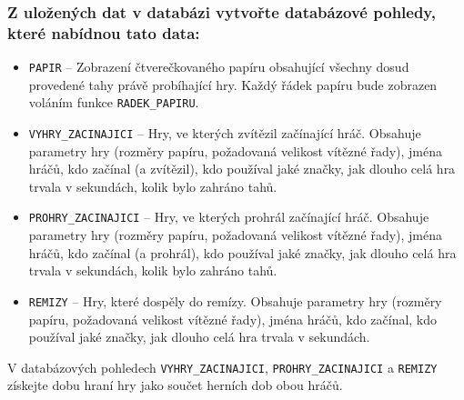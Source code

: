 \documentclass[
11pt,
a4paper,
pdftex,
czech,
titlepage
]{report}
\begin{document}
\subsubsection{Z uložených dat v databázi vytvořte databázové pohledy, které nabídnou tato data:}
\begin{itemize}
    \item \begin{sloppypar}\texttt{PAPIR} -- Zobrazení čtverečkovaného papíru obsahující všechny dosud provedené tahy právě probíhající hry. Každý řádek papíru bude zobrazen voláním funkce \texttt{RADEK\_PAPIRU}.
    \end{sloppypar}
    \item \texttt{VYHRY\_ZACINAJICI} -- Hry, ve kterých zvítězil začínající hráč. Obsahuje parametry hry (rozměry papíru, požadovaná velikost vítězné řady), jména hráčů, kdo začínal (a zvítězil), kdo používal jaké značky, jak dlouho celá hra trvala v sekundách, kolik bylo zahráno tahů.
    \item \texttt{PROHRY\_ZACINAJICI} -- Hry, ve kterých prohrál začínající hráč. Obsahuje parametry hry (rozměry papíru, požadovaná velikost vítězné řady), jména hráčů, kdo začínal (a prohrál), kdo používal jaké značky, jak dlouho celá hra trvala v sekundách, kolik bylo zahráno tahů.
    \item \texttt{REMIZY} -- Hry, které dospěly do remízy. Obsahuje parametry hry (rozměry papíru, požadovaná velikost vítězné řady), jména hráčů, kdo začínal, kdo používal jaké značky, jak dlouho celá hra trvala v sekundách.
\end{itemize}

V databázových pohledech \texttt{VYHRY\_ZACINAJICI}, \texttt{PROHRY\_ZACINAJICI} a \texttt{REMIZY} získejte dobu hraní hry jako součet herních dob obou hráčů.
\end{document}
